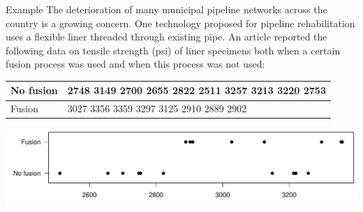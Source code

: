 \documentclass[handout]{beamer}
\begin{document}
\begin{frame}{Example}
The deterioration of many municipal pipeline networks across the country is a growing concern. One technology proposed for pipeline rehabilitation uses a flexible liner
threaded through existing pipe. An article reported the following data on tensile strength (psi) of liner specimens both when a certain fusion process was used and when this process was not used:

\begin{center}
\begin{tabular}{l|p{9cm}}
No fusion &
2748
3149
2700
2655
2822
2511
3257
3213
3220
2753
\\ \hline
Fusion &
3027
3356
3359
3297
3125
2910
2889
2902
\end{tabular}
\end{center}

\includegraphics[scale=.5]{ch9_dotplot.pdf}
\end{frame}
\end{document}
